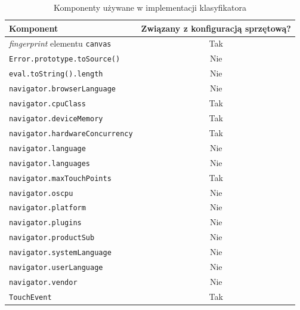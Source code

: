 \begin{table}
	\centering
	\caption{Komponenty używane w implementacji klasyfikatora}
	\begin{tabular}{|l|c|}
		\hline
		Komponent                                   & Związany z konfiguracją sprzętową? \\
		\hline
		\emph{fingerprint} elementu \texttt{canvas} & Tak                                    \\
		\texttt{Error.prototype.toSource()}         & Nie                                    \\
		\texttt{eval.toString().length}             & Nie                                    \\
		\texttt{navigator.browserLanguage}          & Nie                                    \\
		\texttt{navigator.cpuClass}                 & Tak                                    \\
		\texttt{navigator.deviceMemory}             & Tak                                    \\
		\texttt{navigator.hardwareConcurrency}      & Tak                                    \\
		\texttt{navigator.language}                 & Nie                                    \\
		\texttt{navigator.languages}                & Nie                                    \\
		\texttt{navigator.maxTouchPoints}           & Tak                                    \\
		\texttt{navigator.oscpu}                    & Nie                                    \\
		\texttt{navigator.platform}                 & Nie                                    \\
		\texttt{navigator.plugins}                  & Nie                                    \\
		\texttt{navigator.productSub}               & Nie                                    \\
		\texttt{navigator.systemLanguage}           & Nie                                    \\
		\texttt{navigator.userLanguage}             & Nie                                    \\
		\texttt{navigator.vendor}                   & Nie                                    \\
		\texttt{TouchEvent}                         & Tak                                    \\

\end{tabular}
\end{table}
